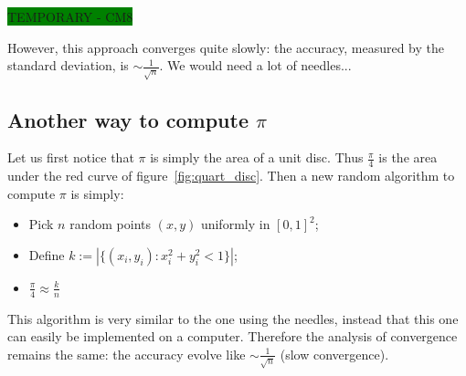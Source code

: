 \colorbox{green}{TEMPORARY - CM8}

However, this approach converges quite slowly: the accuracy, measured by the standard deviation, is $\sim \frac{1}{\sqrt{n}}$. We would need a lot of needles...

\subsection[Another way to compute  \texorpdfstring{$\pi$}{pi}]{Another way to compute $\pi$}

Let us first notice that $\pi$ is simply the area of a unit disc. Thus $\frac{\pi}{4}$ is the area under the red curve of figure~\ref{fig:quart_disc}. Then a new random algorithm to compute $\pi$ is simply:
\begin{itemize}
	\item Pick $n$ random points $(x,y)$ uniformly in $[0,1]^2$;
	\item Define $k:=|\{(x_i,y_i):x_i^2+y_i^2<1\}|$;
	\item $\frac{\pi}{4}\approx \frac{k}{n}$
\end{itemize}

This algorithm is very similar to the one using the needles, instead that this one can easily be implemented on a computer. Therefore the analysis of convergence remains the same: the accuracy evolve like $\sim \frac{1}{\sqrt{n}}$ (slow convergence).

\begin{figure}[h!]%
    \centering
    ~
		\\
		\caption{} 
		\label{fig:compute_pi}
\end{figure}


